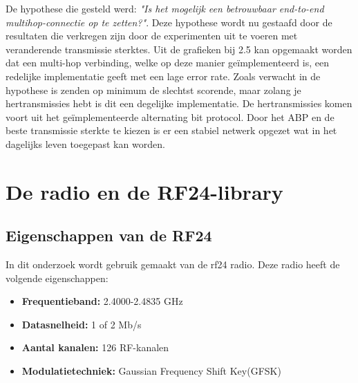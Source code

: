 \documentclass{article}
\begin{document}
De hypothese die gesteld werd: \textit{"Is het mogelijk een betrouwbaar end-to-end multihop-connectie op te zetten?"}.
Deze hypothese wordt nu gestaafd door de resultaten die verkregen zijn door de experimenten uit te voeren met veranderende transmissie sterktes. 
Uit de grafieken bij 2.5 kan opgemaakt worden dat een multi-hop verbinding, welke op deze manier ge\"{i}mplementeerd is, een redelijke implementatie geeft met een lage error rate. Zoals verwacht in de hypothese is zenden op minimum de slechtst scorende, maar zolang je hertransmissies hebt is dit een degelijke implementatie. 
De hertransmissies komen voort uit het ge\"{i}mplementeerde alternating bit protocol. Door het ABP en de beste transmissie sterkte te kiezen is er een stabiel netwerk opgezet wat in het dagelijks leven toegepast kan worden. 
\clearpage





\newpage
\appendix
\section{De radio en de RF24-library}
\subsection{Eigenschappen van de RF24}
In dit onderzoek wordt gebruik gemaakt van de rf24 radio. Deze radio heeft de volgende eigenschappen:
	\begin{itemize}	
	\item\textbf{Frequentieband: }2.4000-2.4835 GHz
	\item\textbf{Datasnelheid: }1 of 2 Mb/s
	\item\textbf{Aantal kanalen: }126 RF-kanalen
	\item\textbf{Modulatietechniek: }Gaussian Frequency Shift Key(GFSK)
	\end{itemize}
	
\end{document}
